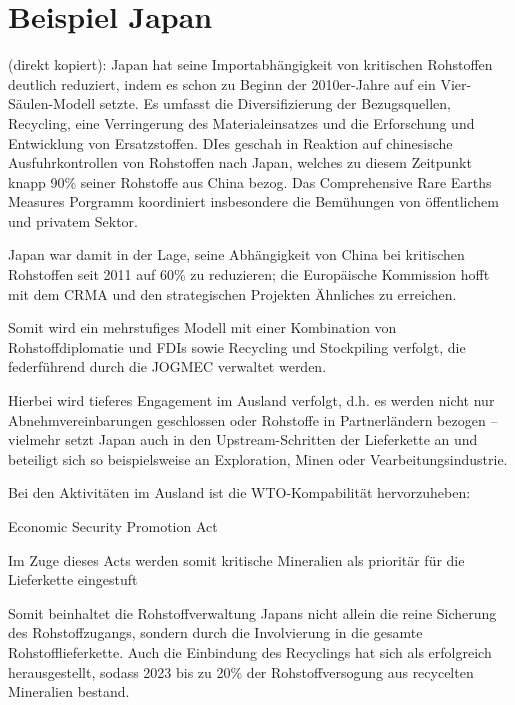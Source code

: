 \documentclass[12pt,a4paper,oneside]{book} %
\begin{document}
{\section{Beispiel Japan}

(direkt kopiert): Japan hat seine Importabhängigkeit von kritischen Rohstoffen deutlich reduziert, indem es schon zu Beginn der 2010er-Jahre auf ein Vier-Säulen-Modell setzte. Es umfasst die Diversifizierung der Bezugsquellen, Recycling, eine Verringerung des Materialeinsatzes und die Erforschung und Entwicklung von Ersatzstoffen.\autocites{https://www.weforum.org/stories/2023/10/japan-rare-earth-minerals/}{bibid} DIes geschah in Reaktion auf chinesische Ausfuhrkontrollen von Rohstoffen nach Japan, welches zu diesem Zeitpunkt knapp 90\% seiner Rohstoffe aus China bezog.\autocite{https://mric.jogmec.go.jp/reports/current/20230817/178631/} Das Comprehensive Rare Earths Measures Porgramm koordiniert insbesondere die Bemühungen von öffentlichem und privatem Sektor.\autocite{https://hamminstitute.org/site-files/documents/tesc_critical_minerals_whitepaper.pdf}

Japan war damit in der Lage, seine Abhängigkeit von China bei kritischen Rohstoffen seit 2011 auf 60\% zu reduzieren; die Europäische Kommission hofft mit dem CRMA und den strategischen Projekten Ähnliches zu erreichen.\autocite{https://www.theguardian.com/world/2026/oct/09/eu-pulling-out-all-stops-with-minerals-projects-as-it-tries-to-avert-china-trade-war}



Somit wird ein mehrstufiges Modell mit einer Kombination von Rohstoffdiplomatie und FDIs sowie Recycling und Stockpiling verfolgt, die federführend durch die JOGMEC verwaltet werden.

Hierbei wird tieferes Engagement im Ausland verfolgt, d.h. es werden nicht nur Abnehmvereinbarungen geschlossen oder Rohstoffe in Partnerländern bezogen -- vielmehr setzt Japan auch in den Upstream-Schritten der Lieferkette an und beteiligt sich so beispielsweise an Exploration, Minen oder Vearbeitungsindustrie.

Bei den Aktivitäten im Ausland ist die WTO-Kompabilität hervorzuheben:

Economic Security Promotion Act

Im Zuge dieses Acts werden somit kritische Mineralien als prioritär für die Lieferkette eingestuft

Somit beinhaltet die Rohstoffverwaltung Japans nicht allein die reine Sicherung des Rohstoffzugangs, sondern durch die Involvierung in die gesamte Rohstofflieferkette. Auch die Einbindung des Recyclings hat sich als erfolgreich herausgestellt, sodass 2023 bis zu 20\% der Rohstoffversogung aus recycelten Mineralien bestand.\autocite{ttps://mric.jogmec.go.jp/reports/current/20230817/178631/}

}
\end{document}
